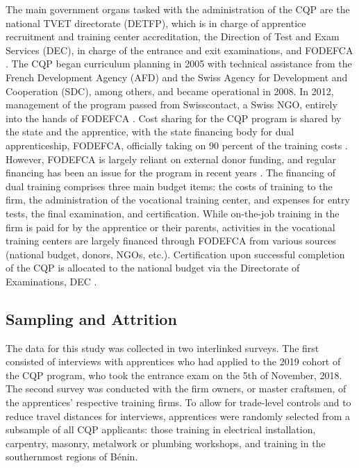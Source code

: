 \documentclass[
  a4paper, twoside, 12pt]{book}
\begin{document}
The main government organs tasked with the administration of the CQP are the national TVET directorate (DETFP), which is in charge of apprentice recruitment and training center accreditation, the Direction of Test and Exam Services (DEC), in charge of the entrance and exit examinations, and FODEFCA \autocite{nouatin2019}. The CQP began curriculum planning in 2005 with technical assistance from the French Development Agency (AFD) and the Swiss Agency for Development and Cooperation (SDC), among others, and became operational in 2008. In 2012, management of the program passed from Swisscontact, a Swiss NGO, entirely into the hands of FODEFCA \autocite{nouatin2019}. Cost sharing for the CQP program is shared by the state and the apprentice, with the state financing body for dual apprenticeship, FODEFCA, officially taking on 90 percent of the training costs \autocite{kofswisseconomicinstitute2017}. However, FODEFCA is largely reliant on external donor funding, and regular financing has been an issue for the program in recent years \autocite{david-gnahoui2017}. The financing of dual training comprises three main budget items: the costs of training to the firm, the administration of the vocational training center, and expenses for entry tests, the final examination, and certification. While on-the-job training in the firm is paid for by the apprentice or their parents, activities in the vocational training centers are largely financed through FODEFCA from various sources (national budget, donors, NGOs, etc.). Certification upon successful completion of the CQP is allocated to the national budget via the Directorate of Examinations, DEC \autocite{david-gnahoui2017}.

\hypertarget{sampling-and-attrition}{%
\subsection{Sampling and Attrition}\label{sampling-and-attrition}}

The data for this study was collected in two interlinked surveys. The first consisted of interviews with apprentices who had applied to the 2019 cohort of the CQP program, who took the entrance exam on the 5th of November, 2018. The second survey was conducted with the firm owners, or master craftsmen, of the apprentices' respective training firms. To allow for trade-level controls and to reduce travel distances for interviews, apprentices were randomly selected from a subsample of all CQP applicants: those training in electrical installation, carpentry, masonry, metalwork or plumbing workshops, and training in the southernmost regions of Bénin.
\end{document}

